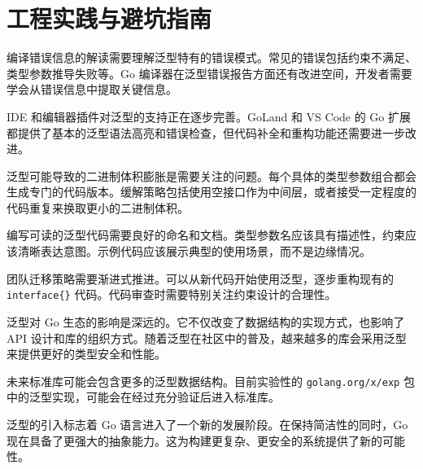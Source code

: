 \chapter{工程实践与避坑指南}
编译错误信息的解读需要理解泛型特有的错误模式。常见的错误包括约束不满足、类型参数推导失败等。Go 编译器在泛型错误报告方面还有改进空间，开发者需要学会从错误信息中提取关键信息。\par
IDE 和编辑器插件对泛型的支持正在逐步完善。GoLand 和 VS Code 的 Go 扩展都提供了基本的泛型语法高亮和错误检查，但代码补全和重构功能还需要进一步改进。\par
泛型可能导致的二进制体积膨胀是需要关注的问题。每个具体的类型参数组合都会生成专门的代码版本。缓解策略包括使用空接口作为中间层，或者接受一定程度的代码重复来换取更小的二进制体积。\par
编写可读的泛型代码需要良好的命名和文档。类型参数名应该具有描述性，约束应该清晰表达意图。示例代码应该展示典型的使用场景，而不是边缘情况。\par
团队迁移策略需要渐进式推进。可以从新代码开始使用泛型，逐步重构现有的 \texttt{interface\{{}\}{}} 代码。代码审查时需要特别关注约束设计的合理性。\par
泛型对 Go 生态的影响是深远的。它不仅改变了数据结构的实现方式，也影响了 API 设计和库的组织方式。随着泛型在社区中的普及，越来越多的库会采用泛型来提供更好的类型安全和性能。\par
未来标准库可能会包含更多的泛型数据结构。目前实验性的 \texttt{golang.org/x/exp} 包中的泛型实现，可能会在经过充分验证后进入标准库。\par
泛型的引入标志着 Go 语言进入了一个新的发展阶段。在保持简洁性的同时，Go 现在具备了更强大的抽象能力。这为构建更复杂、更安全的系统提供了新的可能性。\par
